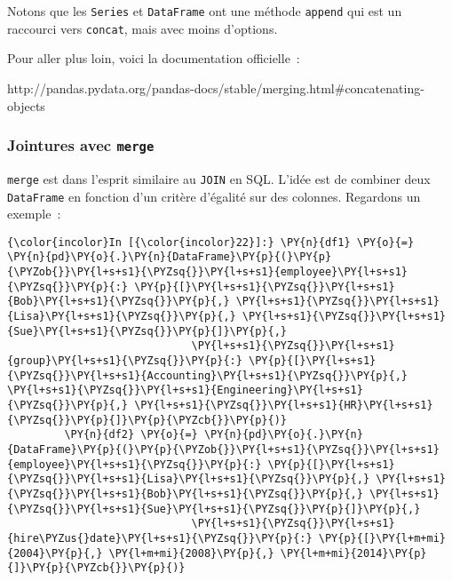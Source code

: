     Notons que les \texttt{Series} et \texttt{DataFrame} ont une méthode
\texttt{append} qui est un raccourci vers \texttt{concat}, mais avec
moins d'options.

Pour aller plus loin, voici la documentation officielle~:

http://pandas.pydata.org/pandas-docs/stable/merging.html\#concatenating-objects

    \hypertarget{jointures-avec-merge}{%
\subsubsection{\texorpdfstring{Jointures avec
\texttt{merge}}{Jointures avec merge}}\label{jointures-avec-merge}}

    \texttt{merge} est dans l'esprit similaire au \texttt{JOIN} en SQL.
L'idée est de combiner deux \texttt{DataFrame} en fonction d'un critère
d'égalité sur des colonnes. Regardons un exemple~:

    \begin{Verbatim}[commandchars=\\\{\},frame=single,framerule=0.3mm,rulecolor=\color{cellframecolor}]
{\color{incolor}In [{\color{incolor}22}]:} \PY{n}{df1} \PY{o}{=} \PY{n}{pd}\PY{o}{.}\PY{n}{DataFrame}\PY{p}{(}\PY{p}{\PYZob{}}\PY{l+s+s1}{\PYZsq{}}\PY{l+s+s1}{employee}\PY{l+s+s1}{\PYZsq{}}\PY{p}{:} \PY{p}{[}\PY{l+s+s1}{\PYZsq{}}\PY{l+s+s1}{Bob}\PY{l+s+s1}{\PYZsq{}}\PY{p}{,} \PY{l+s+s1}{\PYZsq{}}\PY{l+s+s1}{Lisa}\PY{l+s+s1}{\PYZsq{}}\PY{p}{,} \PY{l+s+s1}{\PYZsq{}}\PY{l+s+s1}{Sue}\PY{l+s+s1}{\PYZsq{}}\PY{p}{]}\PY{p}{,}
                             \PY{l+s+s1}{\PYZsq{}}\PY{l+s+s1}{group}\PY{l+s+s1}{\PYZsq{}}\PY{p}{:} \PY{p}{[}\PY{l+s+s1}{\PYZsq{}}\PY{l+s+s1}{Accounting}\PY{l+s+s1}{\PYZsq{}}\PY{p}{,} \PY{l+s+s1}{\PYZsq{}}\PY{l+s+s1}{Engineering}\PY{l+s+s1}{\PYZsq{}}\PY{p}{,} \PY{l+s+s1}{\PYZsq{}}\PY{l+s+s1}{HR}\PY{l+s+s1}{\PYZsq{}}\PY{p}{]}\PY{p}{\PYZcb{}}\PY{p}{)}
         \PY{n}{df2} \PY{o}{=} \PY{n}{pd}\PY{o}{.}\PY{n}{DataFrame}\PY{p}{(}\PY{p}{\PYZob{}}\PY{l+s+s1}{\PYZsq{}}\PY{l+s+s1}{employee}\PY{l+s+s1}{\PYZsq{}}\PY{p}{:} \PY{p}{[}\PY{l+s+s1}{\PYZsq{}}\PY{l+s+s1}{Lisa}\PY{l+s+s1}{\PYZsq{}}\PY{p}{,} \PY{l+s+s1}{\PYZsq{}}\PY{l+s+s1}{Bob}\PY{l+s+s1}{\PYZsq{}}\PY{p}{,} \PY{l+s+s1}{\PYZsq{}}\PY{l+s+s1}{Sue}\PY{l+s+s1}{\PYZsq{}}\PY{p}{]}\PY{p}{,}
                             \PY{l+s+s1}{\PYZsq{}}\PY{l+s+s1}{hire\PYZus{}date}\PY{l+s+s1}{\PYZsq{}}\PY{p}{:} \PY{p}{[}\PY{l+m+mi}{2004}\PY{p}{,} \PY{l+m+mi}{2008}\PY{p}{,} \PY{l+m+mi}{2014}\PY{p}{]}\PY{p}{\PYZcb{}}\PY{p}{)}
\end{Verbatim}


